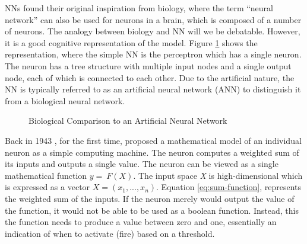 \documentclass[11pt]{article}
\begin{document}
NNs found their original inspiration from biology, where the term ``neural network'' can also be used for neurons in a brain, which is composed of a number of neurons. The analogy between biology and NN will we be debatable. However, it is a good cognitive representation of the model. Figure \ref{fig:biology-nn} shows the representation, where the simple NN is the perceptron which has a single neuron. The neuron has a tree structure with multiple input nodes and a single output node, each of which is connected to each other. Due to the artificial nature, the NN is typically referred to as an artificial neural network (ANN) to distinguish it from a biological neural network.
\begin{figure}[!ht]
	\centering
	\caption{Biological Comparison to an Artificial Neural Network}
	\label{fig:biology-nn}
\end{figure}

Back in 1943 \citet{McCulloch1990AActivity}, for the first time, proposed a mathematical model of an individual neuron as a simple computing machine. The neuron computes a weighted sum of its inputs and outputs a single value. The neuron can be viewed as a single mathematical function \(y=\ F\left(X\right)\). The input space \textit{X} is high-dimensional which is expressed as a vector \(X=\left(x_1,...,x_n\right)\). Equation \ref{eq:sum-function}, represents the weighted sum of the inputs. If the neuron merely would output the value of the function, it would not be able to be used as a boolean function. Instead, this the function needs to produce a value between zero and one, essentially an indication of when to activate (fire) based on a threshold.
\end{document}
